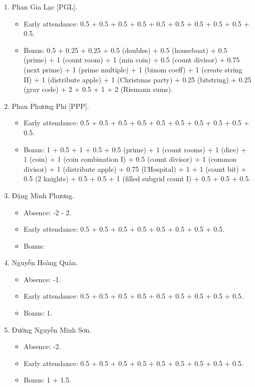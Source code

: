 \documentclass{article}
\begin{document}
\begin{enumerate}
\begin{itemize}
	\end{itemize}
	\item {\sc Phan Gia Lạc [PGL].}
	\begin{itemize}
		\item Early attendance: 0.5 + 0.5 + 0.5 + 0.5 + 0.5 + 0.5 + 0.5 + 0.5 + 0.5 + 0.5.
		\item Bonus: 0.5 + 0.25 + 0.25 + 0.5 (doubles) + 0.5 (houseboat) + 0.5 (prime) + 1 (count room) + 1 (min coin) + 0.5 (count divisor) + 0.75 (next prime) + 1 (prime multiple) + 1 (binom coeff) + 1 (create string II) + 1 (distribute apple) + 1 (Christmas party) + 0.25 (bitstring) + 0.25 (gray code) + 2 + 0.5 + 1 + 2 (Riemann sums).
	\end{itemize}
	\item {\sc Phan Phương Phi [PPP].}
	\begin{itemize}
		\item Early attendance: 0.5 + 0.5 + 0.5 + 0.5 + 0.5 + 0.5 + 0.5 + 0.5 + 0.5 + 0.5.
		\item Bonus: 1 + 0.5 + 1 + 0.5 + 0.5 (prime) + 1 (count rooms) + 1 (dice) + 1 (coin) + 1 (coin combination I) + 0.5 (count divisor) + 1 (common divisor) + 1 (distribute apple) + 0.75 (l'Hospital) + 1 + 1 (count bit) + 0.5 (2 knights) + 0.5 + 0.5 + 1 (filled subgrid count I) + 0.5 + 0.5 + 0.5.
	\end{itemize}
	\item {\sc Đặng Minh Phương.}
	\begin{itemize}
        \item Absence: -2 - 2.
		\item Early attendance: 0.5 + 0.5 + 0.5 + 0.5 + 0.5 + 0.5 + 0.5 + 0.5.
		\item Bonus:
	\end{itemize}
	\item {\sc Nguyễn Hoàng Quân.}
	\begin{itemize}
        \item Absence: -1.
		\item Early attendance: 0.5 + 0.5 + 0.5 + 0.5 + 0.5 + 0.5 + 0.5 + 0.5 + 0.5.
		\item Bonus: 1.
	\end{itemize}
	\item {\sc Đường Nguyễn Minh Sơn.}
	\begin{itemize}
        \item Absence: -2.
		\item Early attendance: 0.5 + 0.5 + 0.5 + 0.5 + 0.5 + 0.5 + 0.5 + 0.5 + 0.5.
		\item Bonus: 1 + 1.5.

\end{itemize}
\end{enumerate}
\end{document}
